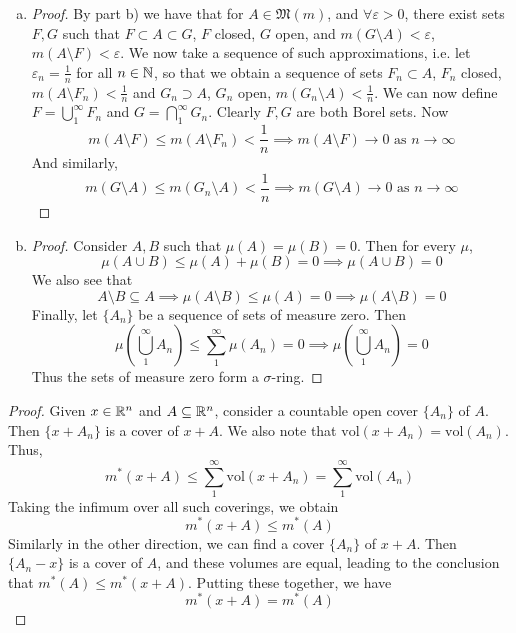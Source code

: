 \documentclass[11pt]{article}
\let\eps\varepsilon
\begin{document}
\begin{exercise}{1}
\begin{enumerate} [(a)]
\begin{proof}
        \end{proof} 
        \item \begin{proof}
            By part b) we have that for $A \in \mathfrak{M}(m)$, and $\forall \eps > 0$, there exist sets $F, G$ such that $F \subset A \subset G$, $F$ closed, $G$ open, and $m(G \setminus A) < \eps$, $m(A \setminus F) < \eps$. We now take a sequence of such approximations, i.e. let $\eps_n = \frac{1}{n}$ for all $n \in \mathbb{N}$, so that we obtain a sequence of sets $F_n \subset A$, $F_n$ closed, $m(A \setminus F_n) < \frac{1}{n}$ and $G_n \supset A$, $G_n$ open, $m(G_n \setminus A) < \frac{1}{n}$. We can now define $F = \bigcup_1^\infty F_n$ and $G = \bigcap_1^\infty G_n$. Clearly $F, G$ are both Borel sets. Now $$m(A \setminus F) \le m(A \setminus F_n) < \frac{1}{n} \implies m(A \setminus F) \to 0 \text{ as } n \to \infty$$ And similarly, $$m(G \setminus A) \le m(G_n \setminus A) < \frac{1}{n} \implies m(G \setminus A) \to 0 \text{ as } n \to \infty$$
        \end{proof}
        \item \begin{proof}
            Consider $A, B$ such that $\mu(A) = \mu(B) = 0$. Then for every $\mu$, $$\mu(A \cup B) \le \mu(A) + \mu(B) = 0 \implies \mu(A \cup B) = 0$$ We also see that $$A \setminus B \subseteq A \implies \mu(A \setminus B) \le \mu(A) = 0 \implies \mu(A \setminus B) = 0$$ Finally, let $\{ A_n \}$ be a sequence of sets of measure zero. Then $$\mu \left( \bigcup_1^\infty A_n \right) \le \sum_1^\infty \mu(A_n) = 0 \implies \mu \left( \bigcup_1^\infty A_n \right) = 0$$ Thus the sets of measure zero form a $\sigma$-ring.
        \end{proof}
    \end{enumerate}
\end{exercise}

\begin{exercise}{2}
    \begin{proof}
        Given $x \in \mathbb{R}^n$ and $A \subseteq \mathbb{R}^n$, consider a countable open cover $\{ A_n \}$ of $A$. Then $\{ x + A_n \}$ is a cover of $x + A$. We also note that $\mathrm{vol}(x + A_n) = \mathrm{vol}(A_n)$. Thus, $$m^*(x + A) \le \sum_1^\infty \mathrm{vol}(x + A_n) = \sum_1^\infty \mathrm{vol}(A_n)$$ Taking the infimum over all such coverings, we obtain $$m^*(x + A) \le m^*(A)$$ Similarly in the other direction, we can find a cover $\{ A_n \}$ of $x + A$. Then $\{ A_n - x \}$ is a cover of $A$, and these volumes are equal, leading to the conclusion that $m^* (A) \le m^*(x + A)$. Putting these together, we have $$m^*(x+A) = m^*(A)$$
    \end{proof}
\end{exercise}
\end{document}
